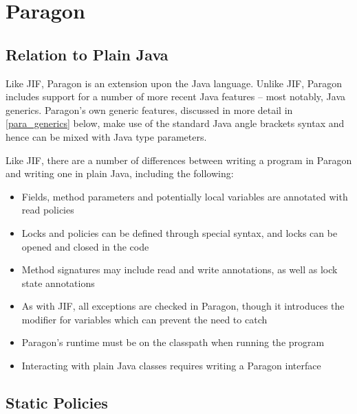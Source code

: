 \section{Paragon}

\subsection{Relation to Plain Java}

Like JIF, Paragon \cite{parawebsite} is an extension upon the Java language. Unlike JIF, Paragon includes support for a number of more recent Java features -- most notably, Java generics. Paragon's own generic features, discussed in more detail in \ref{para_generics} below, make use of the standard Java angle brackets syntax and hence can be mixed with Java type parameters.

Like JIF, there are a number of differences between writing a program in Paragon and writing one in plain Java, including the following:

\begin{itemize}
	
	\item Fields, method parameters and potentially local variables are annotated with read policies
	
	\item Locks and policies can be defined through special syntax, and locks can be opened and closed in the code
	
	\item Method signatures may include read and write annotations, as well as lock state annotations
	
	\item As with JIF, all exceptions are checked in Paragon, though it introduces the  modifier for variables which can prevent the need to catch 
	
	\item Paragon's runtime must be on the classpath when running the program
	
	\item Interacting with plain Java classes requires writing a Paragon interface
	
\end{itemize}

\newpage

\subsection{Static Policies}

